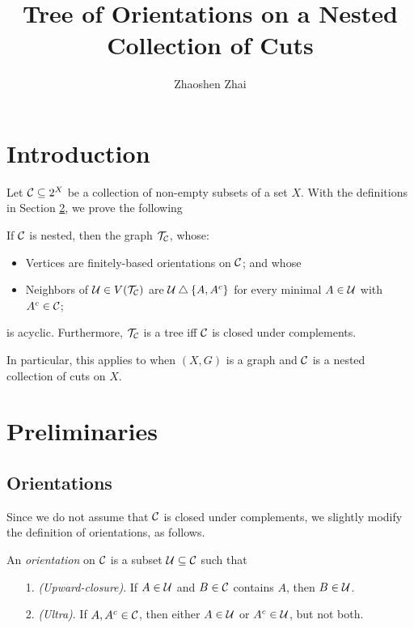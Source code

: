 \documentclass{amsart}
\begin{document}
    \title{Tree of Orientations on a Nested Collection of Cuts}
    \author{Zhaoshen Zhai}
    \maketitle

    \section{Introduction}
    Let $\mathcal{C}\subseteq2^X$ be a collection of non-empty subsets of a set $X$. With the definitions in Section \ref{prelim}, we prove the following
    \begin{theorem}\label{main}
        If $\mathcal{C}$ is nested, then the graph $\mathcal{T}_{\mathcal{C}}$, whose:
        \begin{itemize}
            \item Vertices are finitely-based orientations on $\mathcal{C}$; and whose
            \item Neighbors of $\mathcal{U}\in V(\mathcal{T}_{\mathcal{C}})$ are $\mathcal{U}\bigtriangleup\left\{A,A^c\right\}$ for every minimal $A\in\mathcal{U}$ with $A^c\in\mathcal{C}$;
        \end{itemize}
        is acyclic. Furthermore, $\mathcal{T}_{\mathcal{C}}$ is a tree iff $\mathcal{C}$ is closed under complements.
    \end{theorem}

    In particular, this applies to when $(X,G)$ is a graph and $\mathcal{C}$ is a nested collection of cuts on $X$.

    \section{Preliminaries}\label{prelim}

    \subsection{Orientations}

    Since we do not assume that $\mathcal{C}$ is closed under complements, we slightly modify the definition of orientations, as follows.

    \begin{definition}
        An \textit{orientation} on $\mathcal{C}$ is a subset $\mathcal{U}\subseteq\mathcal{C}$ such that
        \begin{enumerate}
            \item[1.] \textit{(Upward-closure)}. If $A\in\mathcal{U}$ and $B\in\mathcal{C}$ contains $A$, then $B\in\mathcal{U}$.
            \item[2.] \textit{(Ultra)}. If $A,A^c\in\mathcal{C}$, then either $A\in\mathcal{U}$ or $A^c\in\mathcal{U}$, but not both.
        \end{enumerate}
    \end{definition}
\end{document}
